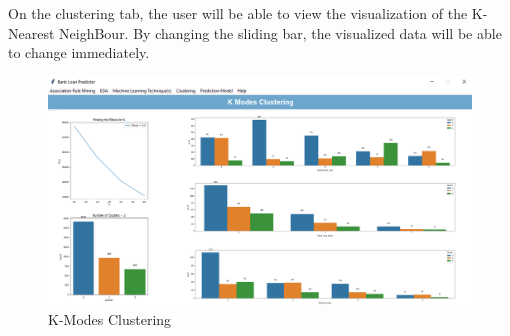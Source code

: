 \documentclass[11pt]{article}
\begin{document}
\clearpage

On the clustering tab, the user will be able to view the visualization of the K-Nearest NeighBour. By changing the sliding bar, the visualized data will be able to change immediately.

\begin{figure}[h]
\centerline{\includegraphics[scale=0.35]{deploy_kmodes.PNG}}
\label{fig:deployKmodes}
\caption{K-Modes Clustering}
\end{figure}

\end{document}
